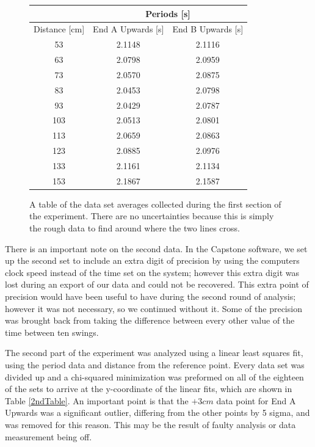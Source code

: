 \documentclass[aps,prl,10pt,twocolumn,floatfix]{revtex4-2}
\begin{document}
\begin{figure}
\begin{tabular}{|c|c|c|}
\hline
& \multicolumn{2}{|c|}{Periods [s]}\\
\hline
Distance [cm] & End A Upwards [s] & End B Upwards [s]\\
\hline
53&	2.1148&	2.1116\\
63&	2.0798&	2.0959\\
73&	2.0570&	2.0875\\
83&	2.0453&	2.0798\\
93&	2.0429&	2.0787\\
103&	2.0513&	2.0801\\
113&	2.0659&	2.0863\\
123&	2.0885&	2.0976\\
133&	2.1161&	2.1134\\
153&	2.1867&	2.1587\\
\hline
\end{tabular}
\caption{A table of the data set averages collected during the first section of the experiment. There are no uncertainties because this is simply the rough data to find around where the two lines cross.}
\label{1stTable}
\end{figure}

There is an important note on the second data. 
In the Capstone software, we set up the second set to include an extra digit of precision by using the computers clock speed instead of the time set on the system;
however this extra digit was lost during an export of our data and could not be recovered.
This extra point of precision would have been useful to have during the second round of analysis;
however it was not necessary, so we continued without it.
Some of the precision was brought back from taking the difference between every other value of the time between ten swings.

The second part of the experiment was analyzed using a linear least squares fit, using the period data and distance from the reference point. 
Every data set was divided up and a chi-squared minimization was preformed on all of the eighteen of the sets to arrive at the y-coordinate of the linear fits, which are shown in Table \ref{2ndTable}.
An important point is that the $+3cm$ data point for End A Upwards was a significant outlier, differing from the other points by 5 sigma, and was removed for this reason.
This may be the result of faulty analysis or data measurement being off. 
\end{document}
